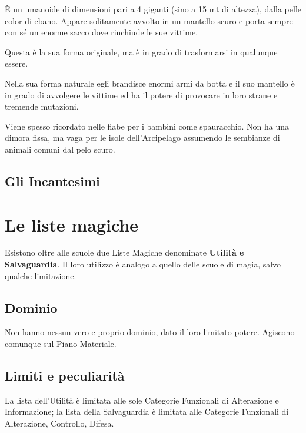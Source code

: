 
\`E un umanoide di dimensioni pari a 4 giganti (sino a 15 mt di
altezza), dalla pelle color di ebano. Appare solitamente avvolto in un
mantello scuro e porta sempre con s\'e un enorme sacco dove rinchiude le
sue vittime.  

Questa \`e la sua forma originale, ma \`e in grado di trasformarsi
in qualunque essere.

Nella sua forma naturale egli brandisce enormi armi da botta e il suo
mantello \`e in grado di avvolgere le vittime ed ha il potere di
provocare in loro strane e tremende mutazioni.  

Viene spesso ricordato nelle fiabe per i bambini come spauracchio. Non
ha una dimora fissa, ma vaga per le isole dell'Arcipelago assumendo le
sembianze di animali comuni dal pelo scuro.
\fi

\subsection{Gli Incantesimi}
\label{incstregoneria}


\vspace{5cm}\vfill{}

\section{Le liste magiche} 

Esistono oltre alle scuole due Liste Magiche denominate
\textbf{Utilit\`a e Salvaguardia}. Il loro utilizzo \`e analogo a
quello delle scuole di magia, salvo qualche limitazione.

\subsection{Dominio}

Non hanno nessun vero e proprio dominio, dato il loro limitato potere.
Agiscono comunque sul Piano Materiale.

\subsection{Limiti e peculiarit\`a}

 La lista dell'Utilit\`a \`e limitata alle sole
Categorie Funzionali di Alterazione e Informazione; la lista della
Salvaguardia \`e limitata alle Categorie Funzionali di Alterazione,
Controllo, Difesa. 


